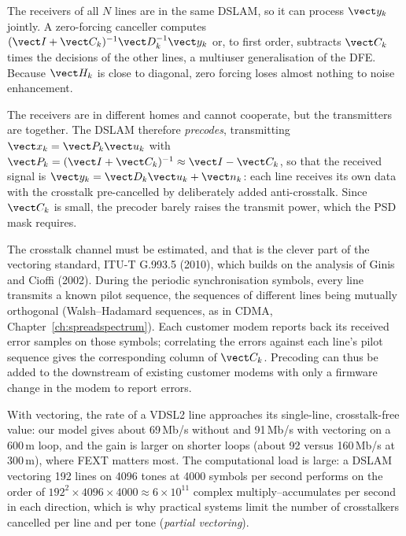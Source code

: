 
\begin{description}[style=nextline,leftmargin=1.2em,font=\sffamily\bfseries\small\color{navy}]
\item[Upstream: joint cancellation.] The receivers of all $N$ lines are in the same DSLAM, so it can
process $\vect y_k$ jointly. A zero-forcing canceller computes $(\vect I+\vect C_k)^{-1}\vect D_k^{-1}\vect y_k$
or, to first order, subtracts $\vect C_k$ times the decisions of the other lines, a multiuser
generalisation of the DFE. Because $\vect H_k$ is close to diagonal, zero forcing loses almost nothing
to noise enhancement.
\item[Downstream: precoding.] The receivers are in different homes and cannot cooperate, but the
transmitters are together. The DSLAM therefore \emph{precodes}, transmitting
$\vect x_k=\vect P_k\vect u_k$ with $\vect P_k=(\vect I+\vect C_k)^{-1}\approx\vect I-\vect C_k$, so that the
received signal is $\vect y_k=\vect D_k\vect u_k+\vect n_k$: each line receives its own data with the
crosstalk pre-cancelled by deliberately added anti-crosstalk. Since $\vect C_k$ is small, the
precoder barely raises the transmit power, which the PSD mask requires.
\end{description}

The crosstalk channel must be estimated, and that is the clever part of the vectoring standard,
ITU-T G.993.5 (2010), which builds on the analysis of Ginis and Cioffi (2002). During the periodic
synchronisation symbols, every line transmits a known pilot sequence, the sequences of different
lines being mutually orthogonal (Walsh--Hadamard sequences, as in CDMA, Chapter~\ref{ch:spreadspectrum}).
Each customer modem reports back its received error samples on those symbols; correlating the errors
against each line's pilot sequence gives the corresponding column of $\vect C_k$. Precoding can thus
be added to the downstream of existing customer modems with only a firmware change in the modem to
report errors.



With vectoring, the rate of a VDSL2 line approaches its single-line, crosstalk-free value: our model
gives about 69\,Mb/s without and 91\,Mb/s with vectoring on a 600\,m loop, and the gain is larger on
shorter loops (about 92 versus 160\,Mb/s at 300\,m), where FEXT matters most. The computational load
is large: a DSLAM vectoring 192 lines on 4096 tones at 4000 symbols per second performs on the order
of $192^2\times4096\times4000\approx6\times10^{11}$ complex multiply--accumulates per second in each
direction, which is why practical systems limit the number of crosstalkers cancelled per line and per
tone (\emph{partial vectoring}).

